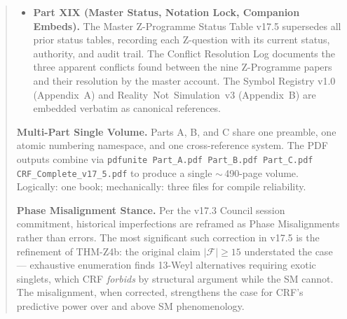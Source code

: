 \documentclass[12pt, a4paper]{article}
\begin{document}
\begin{abstract}
\begin{itemize}[leftmargin=2em]
\item \textbf{Part XIX (Master Status, Notation Lock, Companion Embeds).}
The Master Z-Programme Status Table v17.5 supersedes all prior
status tables, recording each Z-question with its current status,
authority, and audit trail. The Conflict Resolution Log documents the
three apparent conflicts found between the nine Z-Programme papers
and their resolution by the master account. The Symbol Registry v1.0
(Appendix~A) and Reality~Not~Simulation~v3 (Appendix~B) are embedded
verbatim as canonical references.
\end{itemize}

\textbf{Multi-Part Single Volume.} Parts A, B, and C share one
preamble, one atomic numbering namespace, and one cross-reference
system. The PDF outputs combine via \texttt{pdfunite Part\_A.pdf
Part\_B.pdf Part\_C.pdf CRF\_Complete\_v17\_5.pdf} to produce a
single $\sim$\,490-page volume. Logically: one book; mechanically:
three files for compile reliability.

\textbf{Phase Misalignment Stance.} Per the v17.3 Council session
commitment, historical imperfections are reframed as Phase
Misalignments rather than errors. The most significant such
correction in v17.5 is the refinement of THM-Z4b: the original
claim $|\mathcal{F}| \geq 15$ understated the case --- exhaustive
enumeration finds 13-Weyl alternatives requiring exotic singlets,
which CRF \emph{forbids} by structural argument while the SM cannot.
The misalignment, when corrected, strengthens the case for CRF's
predictive power over and above SM phenomenology.
\end{abstract}

\tableofcontents
\newpage
\end{document}

